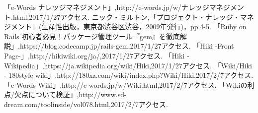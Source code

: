 \begin{thebibliography}{8}
「e-Words ナレッジマネジメント」,{http://e-words.jp/w/ナレッジマネジメント.html},2017/1/27アクセス.
ニック・ミルトン,「プロジェクト・ナレッジ・マネジメント」(生産性出版，東京都渋谷区渋谷，2009年発行)，pp.4-5.
「Ruby on Rails 初心者必見！パッケージ管理ツール『gem』を徹底解説」,{https://blog.codecamp.jp/rails-gem},2017/1/27アクセス.
「Hiki -Front Page-」,{http://hikiwiki.org/ja/},2017/1/27アクセス.
「Hiki -Wikipedia」,{https://ja.wikipedia.org/wiki/Hiki},2017/1/27アクセス.
「Wiki/Hiki - 180style wiki」,{http://180xz.com/wiki/index.php?Wiki/Hiki},2017/2/7アクセス.
「e-Words Wiki」,{http://e-words.jp/w/Wiki.html},2017/2/7アクセス.
「Wikiの利点/欠点について検証」,{http://www.sd-dream.com/toolinside/vol078.html},2017/2/7アクセス.
\end{thebibliography}